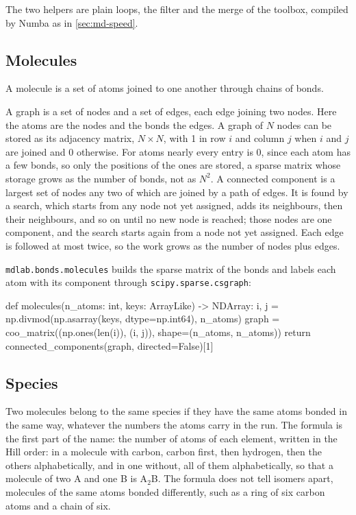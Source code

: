 \noindent The two helpers are plain loops, the filter and the merge of the
toolbox, compiled by Numba as in \cref{sec:md-speed}.

\subsection*{Molecules}

A molecule is a set of atoms joined to one another through chains of
bonds.

\begin{toolbox}
A graph is a set of nodes and a set of edges, each edge joining two
nodes. Here the atoms are the nodes and the bonds the edges. A graph of
$N$ nodes can be stored as its adjacency matrix, $N\times N$, with 1 in
row $i$ and column $j$ when $i$ and $j$ are joined and 0 otherwise. For
atoms nearly every entry is 0, since each atom has a few bonds, so only
the positions of the ones are stored, a sparse matrix whose storage grows
as the number of bonds, not as $N^2$. A connected component is a largest
set of nodes any two of which are joined by a path of edges. It is found
by a search, which starts from any node not yet assigned, adds its
neighbours, then their neighbours, and so on until no new node is
reached; those nodes are one component, and the search starts again from
a node not yet assigned. Each edge is followed at most twice, so the work grows
as the number of nodes plus edges.
\end{toolbox}

\noindent \texttt{mdlab.bonds.molecules} builds the sparse matrix of the
bonds and labels each atom with its component through
\texttt{scipy.sparse.csgraph}:

\begin{code}
def molecules(n_atoms: int, keys: ArrayLike) -> NDArray:
    i, j = np.divmod(np.asarray(keys, dtype=np.int64), n_atoms)
    graph = coo_matrix((np.ones(len(i)), (i, j)), shape=(n_atoms, n_atoms))
    return connected_components(graph, directed=False)[1]
\end{code}

\subsection*{Species}

Two molecules belong to the same species if they have the same atoms
bonded in the same way, whatever the numbers the atoms carry in the run.
The formula is the first part of the name: the number of atoms of each
element, written in the Hill order: in a molecule with carbon, carbon
first, then hydrogen, then the others alphabetically, and in one without,
all of them alphabetically, so that a molecule of two A and one B is
A$_2$B.
The formula does not tell isomers apart, molecules of the same atoms
bonded differently, such as a ring of six carbon atoms and a chain of
six.

